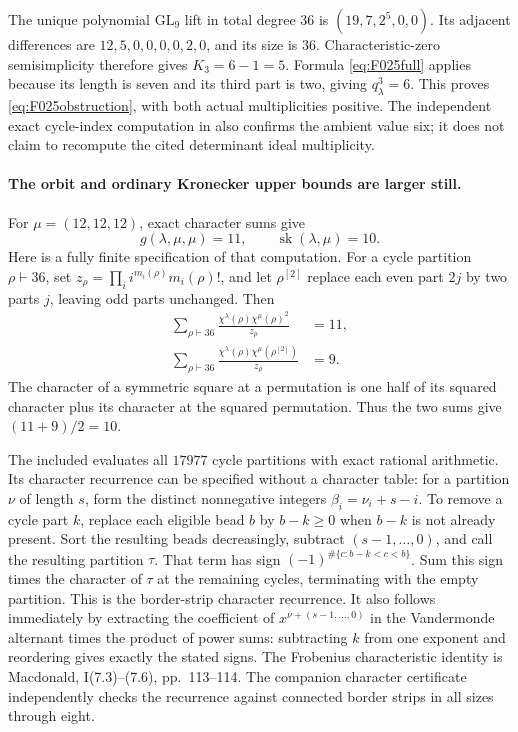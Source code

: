 The unique polynomial \(\mathrm{GL}_9\) lift in total degree 36 is
\((19,7,2^5,0,0)\). Its adjacent differences are
\(12,5,0,0,0,0,2,0\), and its size is 36.
Characteristic-zero semisimplicity therefore gives
\(K_3=6-1=5\). Formula \eqref{eq:F025full} applies
because its length is seven and its third part is two,
giving \(q^3_\lambda=6\). This proves
\eqref{eq:F025obstruction}, with both actual multiplicities
positive. The independent exact cycle-index computation
in 
also confirms the ambient value six; it does not claim
to recompute the cited determinant ideal multiplicity.

\paragraph{The orbit and ordinary Kronecker upper bounds are larger still.}
For \(\mu=(12,12,12)\), exact character sums give
\[
 g(\lambda,\mu,\mu)=11,\qquad
             \operatorname{sk}(\lambda,\mu)=10.
                                                               \tag{F-025.8}
\]
Here is a fully finite specification of that computation.
For a cycle partition \(\rho\vdash36\), set
\(z_\rho=\prod_i i^{m_i(\rho)}m_i(\rho)!\), and let
\(\rho^{[2]}\) replace each even part \(2j\) by two
parts \(j\), leaving odd parts unchanged. Then
\[
\begin{split}
 \sum_{\rho\vdash36}
  \frac{\chi^\lambda(\rho)\chi^\mu(\rho)^2}{z_\rho}&=11,\\
 \sum_{\rho\vdash36}
  \frac{\chi^\lambda(\rho)\chi^\mu(\rho^{[2]})}{z_\rho}&=9.
\end{split}                                                   \tag{F-025.9}
\]
The character of a symmetric square at a permutation is
one half of its squared character plus its character at
the squared permutation. Thus the two sums give
\((11+9)/2=10\).

The included
evaluates all \(17977\) cycle partitions with exact rational
arithmetic. Its character recurrence can be specified without
a character table: for a partition \(\nu\) of length \(s\),
form the distinct nonnegative integers
\(\beta_i=\nu_i+s-i\). To remove a cycle part \(k\),
replace each eligible bead \(b\) by \(b-k\geq0\) when
\(b-k\) is not already present. Sort the resulting beads
decreasingly, subtract \((s-1,\ldots,0)\), and call the
resulting partition \(\tau\). That term has sign
\((-1)^{\#\{c:b-k<c<b\}}\). Sum this sign times the
character of \(\tau\) at the remaining cycles, terminating
with the empty partition. This is the border-strip character
recurrence. It also follows immediately by extracting the
coefficient of \(x^{\nu+(s-1,\ldots,0)}\) in the
Vandermonde alternant times the product of power sums:
subtracting \(k\) from one exponent and reordering gives
exactly the stated signs. The Frobenius characteristic
identity is Macdonald, I(7.3)--(7.6), pp.~113--114.
The companion character certificate independently checks
the recurrence against connected border strips in all sizes
through eight.

